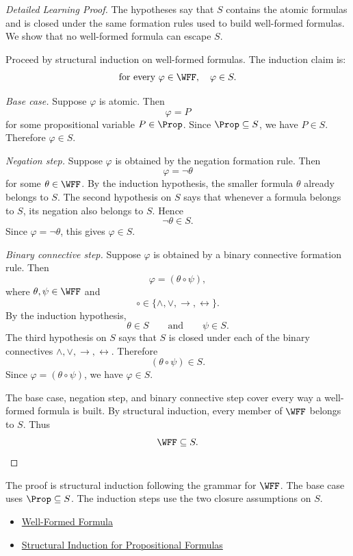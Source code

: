 \begin{proof}[Detailed Learning Proof]
\LRAProofBodyStart
The hypotheses say that \(S\) contains the atomic formulas and is closed
under the same formation rules used to build well-formed formulas. We show
that no well-formed formula can escape \(S\).

Proceed by structural induction on well-formed formulas. The induction claim
is:
\[
\text{for every }\varphi\in\WFF,\quad \varphi\in S.
\]

\emph{Base case.} Suppose \(\varphi\) is atomic. Then
\[
\varphi=P
\]
for some propositional variable \(P\in\Prop\). Since \(\Prop\subseteq S\),
we have \(P\in S\). Therefore \(\varphi\in S\).

\emph{Negation step.} Suppose \(\varphi\) is obtained by the negation
formation rule. Then
\[
\varphi=\neg\theta
\]
for some \(\theta\in\WFF\). By the induction hypothesis, the smaller formula
\(\theta\) already belongs to \(S\). The second hypothesis on \(S\) says that
whenever a formula belongs to \(S\), its negation also belongs to \(S\). Hence
\[
\neg\theta\in S.
\]
Since \(\varphi=\neg\theta\), this gives \(\varphi\in S\).

\emph{Binary connective step.} Suppose \(\varphi\) is obtained by a binary
connective formation rule. Then
\[
\varphi=(\theta\circ\psi),
\]
where \(\theta,\psi\in\WFF\) and
\[
\circ\in\{\land,\lor,\to,\leftrightarrow\}.
\]
By the induction hypothesis,
\[
\theta\in S
\qquad\text{and}\qquad
\psi\in S.
\]
The third hypothesis on \(S\) says that \(S\) is closed under each of the
binary connectives \(\land,\lor,\to,\leftrightarrow\). Therefore
\[
(\theta\circ\psi)\in S.
\]
Since \(\varphi=(\theta\circ\psi)\), we have \(\varphi\in S\).

The base case, negation step, and binary connective step cover every way a
well-formed formula is built. By structural induction, every member of
\(\WFF\) belongs to \(S\). Thus
\[
\WFF\subseteq S.
\]
\end{proof}

\begin{remark*}
The proof is structural induction following the grammar for \(\WFF\). The
base case uses \(\Prop\subseteq S\). The induction steps use the two closure
assumptions on \(S\).
\end{remark*}

\begin{dependencies}
\begin{itemize}
  \item \hyperref[def:well-formed-formula]{Well-Formed Formula}
  \item \hyperref[thm:structural-induction-propositional-formulas]{Structural Induction for Propositional Formulas}
\end{itemize}
\end{dependencies}

\clearpage
